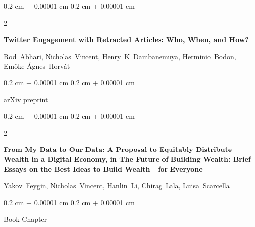 \documentclass[10pt, letterpaper]{article}
\newenvironment{onecolentry}{
    \begin{adjustwidth}{
        0.2 cm + 0.00001 cm
    }{
        0.2 cm + 0.00001 cm
    }
}{
    \end{adjustwidth}
} %
\newenvironment{twocolentry}[2][]{
    \onecolentry
    \def\secondColumn{#2}
    \setcolumnwidth{\fill, 4.1 cm}
    \begin{paracol}{2}
}{
    \switchcolumn \raggedleft \secondColumn
    \end{paracol}
    \endonecolentry
} %
\begin{document}
        \begin{samepage}
            \begin{twocolentry}{
                2022
            }
                \textbf{Twitter Engagement with Retracted Articles: Who, When, and How?}

                \vspace{0.10 cm}

                \mbox{Rod Abhari}, \mbox{Nicholas Vincent}, \mbox{Henry K Dambanemuya}, \mbox{Herminio Bodon}, \mbox{Emőke-Ágnes Horvát}
            \end{twocolentry}


            \vspace{0.10 cm}

            \begin{onecolentry}
        arXiv preprint    \end{onecolentry}
        \end{samepage}

        \vspace{0.2 cm}

        \begin{samepage}
            \begin{twocolentry}{
                2021
            }
                \textbf{From My Data to Our Data: A Proposal to Equitably Distribute Wealth in a Digital Economy, in The Future of Building Wealth: Brief Essays on the Best Ideas to Build Wealth—for Everyone}

                \vspace{0.10 cm}

                \mbox{Yakov Feygin}, \mbox{Nicholas Vincent}, \mbox{Hanlin Li}, \mbox{Chirag Lala}, \mbox{Luisa Scarcella}
            \end{twocolentry}


            \vspace{0.10 cm}

            \begin{onecolentry}
        Book Chapter    \end{onecolentry}
        \end{samepage}

        \vspace{0.2 cm}
\end{document}
